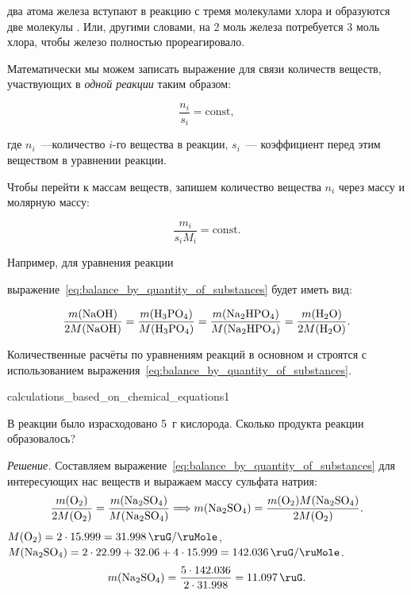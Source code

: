два атома железа вступают в реакцию с тремя молекулами хлора и образуются две молекулы . Или, другими словами, на 2 моль железа потребуется 3 моль хлора, чтобы железо полностью прореагировало.

Математически мы можем записать выражение для связи количеств веществ, участвующих в \emph{одной реакции} таким образом:

\begin{equation}
    \frac{n_i}{s_i} = \text{const},
\end{equation}

где $n_i$~---количество $i$-го вещества в реакции, $s_i$~--- коэффициент перед этим веществом в уравнении реакции.

Чтобы перейти к массам веществ, запишем количество вещества $n_i$ через массу и молярную массу:

\begin{equation}
    \label{eq:balance_by_quantity_of_substances}
    \boxed{\frac{m_i}{s_iM_i} = \text{const}}.
\end{equation}

Например, для уравнения реакции


выражение~\eqref{eq:balance_by_quantity_of_substances} будет иметь вид:

\begin{equation*}
    \frac{m(\ce{NaOH})}{2M(\ce{NaOH})} = \frac{m(\ce{H3PO4})}{M(\ce{H3PO4})} = \frac{m(\ce{Na2HPO4})}{M(\ce{Na2HPO4})} = \frac{m(\ce{H2O})}{2M(\ce{H2O})}.
\end{equation*}

Количественные расчёты по уравнениям реакций в основном и строятся с использованием выражения~\eqref{eq:balance_by_quantity_of_substances}.

\begin{example}{}{calculations_based_on_chemical_equations1}
    \begin{condition}
        В реакции
        было израсходовано 5~г кислорода. Сколько продукта реакции образовалось?
    \end{condition}

    \medskip

    \textit{Решение.} Составляем выражение~\eqref{eq:balance_by_quantity_of_substances} для интересующих нас веществ и выражаем массу сульфата натрия:
    \begin{equation*}
        \frac{m(\ce{O2})}{2M(\ce{O2})} = \frac{m(\ce{Na2SO4})}{M(\ce{Na2SO4})} \Longrightarrow m(\ce{Na2SO4}) = \frac{m(\ce{O2})M(\ce{Na2SO4})}{2M(\ce{O2})}.
    \end{equation*}
    $M(\ce{O2}) = 2 \cdot \num{15,999} = \qty{31,998}{\ruG\per\ruMole}$, \\$M(\ce{Na2SO4}) = 2 \cdot \num{22,99} + \num{32,06} + 4 \cdot \num{15,999} = \qty{142.036}{\ruG\per\ruMole}$.
    \begin{equation*}
        m(\ce{Na2SO4}) = \frac{5 \cdot \num{142,036}}{2 \cdot \num{31,998}} = \qty{11,097}{\ruG}.
    \end{equation*}
\end{example}

